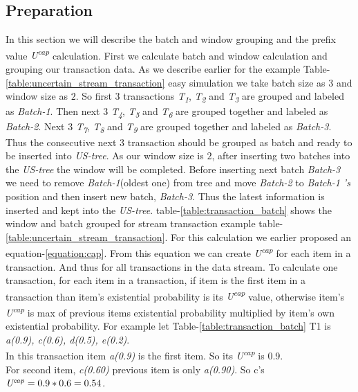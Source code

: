	\subsection{Preparation}
	
	In this section we will describe the batch and window grouping and the prefix value \emph{U\textsuperscript{cap}} calculation. First we calculate batch and window calculation and grouping our transaction data. As we describe earlier for the example Table-\ref{table:uncertain_stream_transaction} easy simulation we take batch size as \emph{$3$} and window size as \emph{$2$}. So first \emph{$3$} transactions \emph{T\textsubscript{1}}, \emph{T\textsubscript{2}} and \emph{T\textsubscript{3}} are grouped and labeled as \emph{Batch-1}. Then next \emph{$3$} \emph{T\textsubscript{4}}, \emph{T\textsubscript{5}} and \emph{T\textsubscript{6}} are grouped together and labeled as \emph{Batch-2}. Next \emph{$3$} \emph{T\textsubscript{7}}, \emph{T\textsubscript{8}} and \emph{T\textsubscript{9}} are grouped together and labeled as \emph{Batch-3}. Thus the consecutive next \emph{$3$} transaction should be grouped as batch and ready to be inserted into \emph{US-tree}. As our window size is $2$, after inserting two batches into the \emph{US-tree} the window will be completed. Before inserting next batch \emph{Batch-3} we need to remove \emph{Batch-1}(oldest one) from tree and move \emph{Batch-2} to \emph{Batch-1 's} position and then insert new batch, \emph{Batch-3}. Thus the latest information is inserted and kept into the \emph{US-tree}. table-\ref{table:transaction_batch} shows the window and batch grouped for stream transaction example table-\ref{table:uncertain_stream_transaction}.
	For this calculation we earlier proposed an equation-\ref{equation:cap}. From this equation we can create \emph{U\textsuperscript{cap}} for each item in a transaction. And thus for all transactions in the data stream. To calculate one transaction, for each item in a transaction, if item is the first item in a transaction than item's existential probability is its \emph{U\textsuperscript{cap}} value, otherwise item's \emph{U\textsuperscript{cap}} is max of previous items existential probability multiplied by item's  own existential probability. For example let Table-\ref{table:transaction_batch} T1 is \emph{a(0.9), c(0.6), d(0.5), e(0.2)}. \\
	In this transaction item \emph{a(0.9)} is the first item. So its \emph{U\textsuperscript{cap}} is 0.9.\\
	For second item, \emph{c(0.60)} previous item is only \emph{a(0.90)}. So c's $\emph{U\textsuperscript{cap}} = 0.9*0.6 = 0.54$. \\
